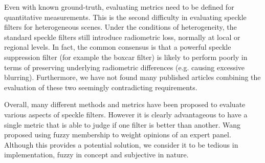 %

Even with known ground-truth, evaluating metrics need to be defined for quantitative measurements.
This is the second difficulty in evaluating speckle filters for heterogeneous scenes.
Under the conditions of heterogeneity, the standard speckle filters still introduce radiometric loss, 
	normally at local or regional levels.
In fact, the common consensus is that a powerful speckle suppression filter (for example the boxcar filter) 
	is likely to perform poorly in terms of preserving underlying radiometric differences 
	(e.g. causing excessive blurring).
Furthermore, we have not found many published articles combining the evaluation
  of these two seemingly contradicting requirements.

Overall, many different methods and metrics have been proposed to evaluate various aspects of speckle filters. 
However it is clearly advantageous to have a single metric that is able to judge if one filter is better than another. 
Wang \cite{Wang_2005_MIPR} proposed using fuzzy membership to weight opinions of an expert panel. 
Although this provides a potential solution, we consider it to be tedious in implementation, fuzzy in concept and 
	subjective in nature.

